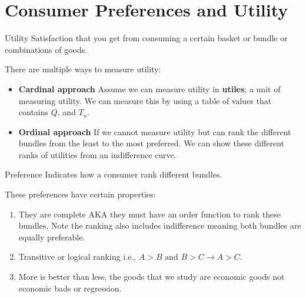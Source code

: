\documentclass[../ECON-281-Notes.tex]{subfiles}
\begin{document}
\chapter{Consumer Preferences and Utility}
\begin{Definition}{Utility} 
  Satisfaction that you get from consuming a certain basket or bundle or combinations of goods.
\end{Definition}
There are multiple ways to measure utility: 
\begin{itemize}
  \item \textbf{Cardinal approach} Assume we can measure utility in \textbf{utiles}; a unit of measuring utility. We can measure this by using a table of values that contains $Q$, and $T_u$.
  \item \textbf{Ordinal approach} If we cannot measure utility but can rank the different bundles from the least to the most preferred. We can show these different ranks of utilities from an indifference curve.
\end{itemize}

\begin{Definition}
  {Preference}
  Indicates how a consumer rank different bundles.
  
  These preferences have certain properties:
  \begin{enumerate}
    \item They are complete AKA they must have an order function to rank these bundles, Note the ranking also includes indifference meaning both bundles are equally preferable.
    \item Transitive or logical ranking i.e., $A > B \text{ and } B > C \to A > C$.
    \item More is better than less, the goods that we study are economic goods not economic bads or regression.
  \end{enumerate}
\end{Definition}
\end{document}
